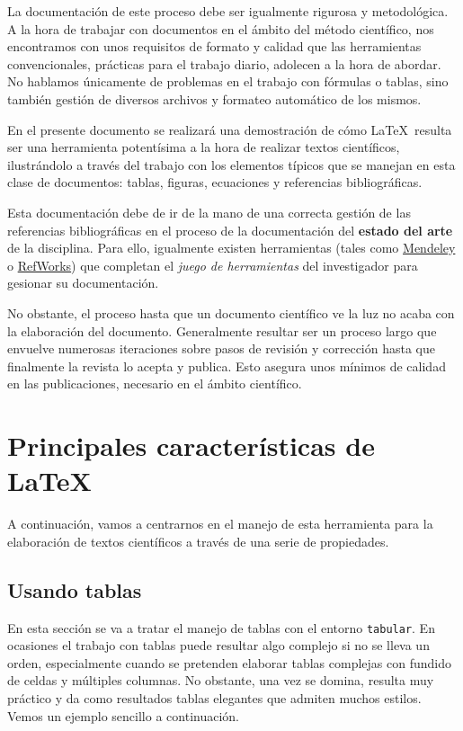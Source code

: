 \documentclass[review]{elsarticle}
\begin{document}
La documentación de este proceso debe ser igualmente rigurosa y metodológica. A la hora de trabajar con documentos en el ámbito del método científico, nos encontramos con unos requisitos de formato y calidad que las herramientas convencionales, prácticas para el trabajo diario, adolecen a la hora de abordar. No hablamos únicamente de problemas en el trabajo con fórmulas o tablas, sino también gestión de diversos archivos y formateo automático de los mismos. 

En el presente documento se realizará una demostración de cómo \LaTeX\ resulta ser una herramienta potentísima a la hora de realizar textos científicos, ilustrándolo a través del trabajo con los elementos típicos que se manejan en esta clase de documentos: tablas, figuras, ecuaciones y referencias bibliográficas.

Esta documentación debe de ir de la mano de una correcta gestión de las referencias bibliográficas en el proceso de la documentación del \textbf{estado del arte} de la disciplina. Para ello, igualmente existen herramientas (tales como \href{https://www.mendeley.com}{Mendeley} o \href{https://www.refworks.com/es/}{RefWorks}) que completan el \textit{juego de herramientas} del investigador para gesionar su documentación.

No obstante, el proceso hasta que un documento científico ve la luz no acaba con la elaboración del documento. Generalmente resultar ser un proceso largo que envuelve numerosas iteraciones sobre pasos de revisión y corrección hasta que finalmente la revista lo acepta y publica. Esto asegura unos mínimos de calidad en las publicaciones, necesario en el ámbito científico. 

\section{Principales características de \LaTeX\ }

A continuación, vamos a centrarnos en el manejo de esta herramienta para la elaboración de textos científicos a través de una serie de propiedades. 
\subsection{Usando tablas}

En esta sección se va a tratar el manejo de tablas con el entorno \texttt{tabular}. En ocasiones el trabajo con tablas puede resultar algo complejo si no se lleva un orden, especialmente cuando se pretenden elaborar tablas complejas con fundido de celdas y múltiples columnas. No obstante, una vez se domina, resulta muy práctico y da como resultados tablas elegantes que admiten muchos estilos. Vemos un ejemplo sencillo a continuación. 
\end{document}
